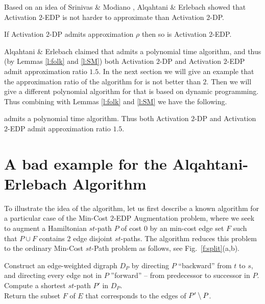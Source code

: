 \documentclass[a4paper,UKenglish,autoref]{lipics-v2019}
\begin{document}
Based on an idea of Srinivas \& Modiano \cite{SM}, Alqahtani \& Erlebach \cite{AE} 
showed that {\sc Activation $2$-EDP} is not harder to approximate than {\sc Activation $2$-DP}.

\begin{lemma}  \label{l:SM}
If {\sc Activation $2$-DP} admits approximation $\rho$ then so is {\sc Activation $2$-EDP}. 
\end{lemma}

Alqahtani \& Erlebach \cite{AE} claimed that 
{\atdpa} admits a polynomial time algorithm,
and thus (by Lemmas \ref{l:folk} and \ref{l:SM}) 
both {\sc Activation $2$-DP} and {\sc Activation $2$-EDP} admit approximation ratio $1.5$. 
In the next section we will give an example that the approximation 
ratio of the \cite{AE} algorithm for {\atdpa} is not better than $2$. 
Then we will give a different polynomial 
algorithm for {\atdpa} that is based on dynamic programming. 
Thus combining with Lemmas \ref{l:folk} and \ref{l:SM} we have the following. 

\begin{theorem} \label{t1}
{\atdpa} admits a polynomial time algorithm. Thus both {\sc Activation $2$-DP} and {\sc Activation $2$-EDP} admit approximation ratio $1.5$. 
\end{theorem}


\section{A bad example for the Alqahtani-Erlebach Algorithm} \label{s:AE}

To illustrate the idea of the \cite{AE} algorithm, let us first describe a known algorithm 
for a particular case of the {\sc Min-Cost $2$-EDP Augmentation} problem, 
where we seek to augment a Hamiltonian $st$-path $P$ of cost $0$ 
by an min-cost edge set $F$ such that $P \cup F$ contains $2$ edge disjoint $st$-paths. 
The algorithm reduces this problem to the ordinary {\sc Min-Cost $st$-Path} problem as follows, 
see Fig.~\ref{f:split}(a,b). 

\medskip 

\begin{algorithm}[H] 
\caption{{\sc Hamiltonian Min-Cost $2$-EDP Augmentation}$((V,E),c,P,\{s,t\})$} \label{alg:cost}
Construct an edge-weighted digraph $D_P$ by directing $P$ ``backward'' from $t$ to $s$, 
and directing every edge not in $P$ ''forward'' -- from predecessor to successor in $P$.   \\
Compute a shortest $st$-path $P'$ in $D_P$.                                                                          \\
Return the subset $F$ of $E$ that corresponds to the edges of $P' \setminus P$.
\end{algorithm}
\end{document}
